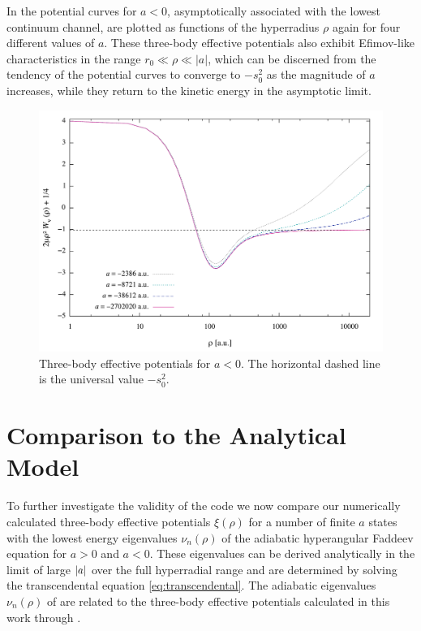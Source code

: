 In  the potential curves for $a<0$, asymptotically associated with the lowest continuum channel, are plotted as functions of the hyperradius $\rho$ again for four different values of $a$. These three-body effective potentials also exhibit Efimov-like characteristics in the range $r_0 \ll \rho \ll |a|$, which can be discerned from the tendency of the potential curves to converge to $-s_0^2$ as the magnitude of $a$ increases, while they return to the kinetic energy in the asymptotic limit.

\begin{figure}[htbp!]
	\includegraphics[width=\linewidth]{finite_negative_a.pdf}
	\caption{Three-body effective potentials for $a<0$. The horizontal dashed line is the universal value $-s_0^2$.}
	\label{fig:res_3}
\end{figure}

\section{Comparison to the Analytical Model}
To further investigate the validity of the code we now compare our numerically calculated three-body effective potentials $\xi(\rho)$ for a number of finite $a$ states with the lowest energy eigenvalues $\nu_n(\rho)$ of the adiabatic hyperangular Faddeev equation for $a>0$ and $a<0$. These eigenvalues can be derived analytically in the limit of large $\lvert a\rvert$ over the full hyperradial range and are determined by solving the transcendental equation \eqref{eq:transcendental}. The adiabatic eigenvalues $\nu_n(\rho)$ of  are related to the three-body effective potentials calculated in this work through . 

